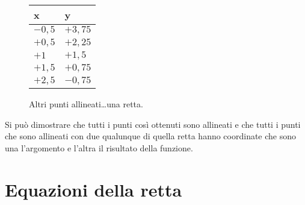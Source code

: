 \begin{inaccessibleblock}
 \begin{figure}[h]
 \centering
 \begin{minipage}[]{.19\textwidth}
  \begin{center}
   \begin{tabular}{l|l}
    \quad x   & \quad y \\
    \hline
    \(-0,5\) & \(+3,75\) \\
    \(+0,5\) & \(+2,25\) \\
    \(+1\)   & \(+1,5\)  \\
    \(+1,5\) & \(+0,75\) \\
    \(+2,5\) & \(-0,75\)
   \end{tabular}
  \end{center}
 \end{minipage}
 \begin{minipage}[]{.39\textwidth}
 \altripunti
 \end{minipage}
 \begin{minipage}[]{.40\textwidth}
 \rettaa
 \end{minipage}
  \caption{Altri punti allineati\dots una retta.}\label{fig:altripunti}
\end{figure}
\end{inaccessibleblock}

Si può dimostrare che tutti i punti così ottenuti sono allineati 
e che tutti i punti che sono allineati con due qualunque di quella retta 
hanno coordinate che sono una l'argomento e l'altra il risultato della 
funzione. 

% 

\section{Equazioni della retta}
\label{sec:retta_equazioni}

